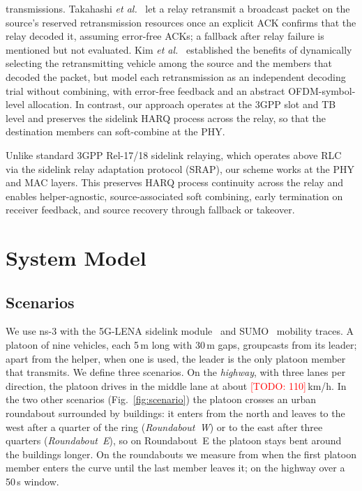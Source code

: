 \documentclass[conference]{IEEEtran}
\newcommand{\todo}[1]{\textcolor{red}{[TODO: #1]}}
\begin{document}
transmissions. Takahashi \emph{et al.}~\cite{aoki2026enhancing} let a relay retransmit a broadcast packet
on the source's reserved retransmission resources once an explicit ACK confirms that the relay decoded it,
assuming error-free ACKs; a fallback after relay failure is mentioned but not evaluated. Kim
\emph{et al.}~\cite{kim2019efficient} established the benefits of dynamically selecting the retransmitting
vehicle among the source and the members that decoded the packet, but model each retransmission as an
independent decoding trial without combining, with error-free feedback and an abstract OFDM-symbol-level
allocation. In contrast, our approach operates at
the 3GPP slot and TB level and preserves the sidelink HARQ process across the relay, so that the
destination members can soft-combine at the PHY.

Unlike standard 3GPP Rel-17/18 sidelink relaying, which operates above RLC via the sidelink relay
adaptation protocol (SRAP), our scheme works at the PHY and MAC layers. This preserves HARQ process
continuity across the relay and enables helper-agnostic, source-associated soft combining, early
termination on receiver feedback, and source recovery through fallback or takeover.

\section{System Model}\label{sec:model}
\subsection{Scenarios}
We use ns-3 with the 5G-LENA sidelink module~\cite{ali20213gpp} and SUMO~\cite{sumo} mobility traces. A
platoon of nine vehicles, each 5\,m long with 30\,m gaps, groupcasts from its leader; apart from the
helper, when one is used, the leader is the only platoon member that transmits. We define three
scenarios. On the \emph{highway}, with three lanes per direction, the platoon drives in the middle lane at
about \todo{110}\,km/h. In the two other scenarios (Fig.~\ref{fig:scenario}) the platoon crosses an urban
roundabout surrounded by buildings: it enters from the north and leaves to the west after a quarter of
the ring (\emph{Roundabout~W}) or to the east after three quarters (\emph{Roundabout~E}), so on
Roundabout~E the platoon stays bent around the buildings longer. On the roundabouts we measure from when
the first platoon member enters the curve until the last member leaves it; on the highway over a 50\,s
window.
\end{document}
